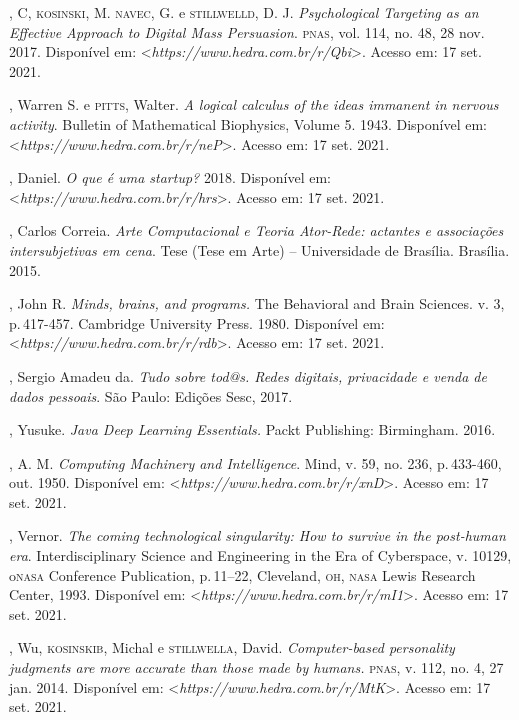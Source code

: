 \begin{bibliohedra}
, C, \textsc{kosinski}, M. \textsc{navec}, G. e \textsc{stillwelld}, D. J.
\emph{Psychological Targeting as an Effective Approach to Digital Mass
Persuasion}. \textsc{pnas}, vol. 114, no. 48, 28 nov. 2017. Disponível em:
\textless{}\emph{https://www.hedra.com.br/r/Qbi}\textgreater{}. Acesso em: 17 set. 2021.

, Warren S. e \textsc{pitts}, Walter. \emph{A logical calculus of the
ideas immanent in nervous activity}. Bulletin of Mathematical
Biophysics, Volume 5. 1943. Disponível em:
\textless{}\emph{https://www.hedra.com.br/r/neP}\textgreater{}. Acesso em: 17 set. 2021.

, Daniel. \emph{O que é uma startup?} 2018. Disponível em:
\textless{}\emph{https://www.hedra.com.br/r/hrs}\textgreater{}. Acesso em: 17 set. 2021.

, Carlos Correia. \emph{Arte Computacional e Teoria Ator-Rede:
actantes e associações intersubjetivas em cena}. Tese (Tese em Arte) --
Universidade de Brasília. Brasília. 2015.

, John R. \emph{Minds, brains, and programs.} The Behavioral and
Brain Sciences. v. 3, p.\,417-457. Cambridge University Press. 1980.
Disponível em: \textless{}\emph{https://www.hedra.com.br/r/rdb}\textgreater{}. Acesso em: 17 set. 2021.

, Sergio Amadeu da. \emph{Tudo sobre tod@s. Redes digitais,
privacidade e venda de dados pessoais}. São Paulo: Edições Sesc, 2017.

, Yusuke. \emph{Java Deep Learning Essentials.} Packt
Publishing: Birmingham. 2016.

, A. M. \emph{Computing Machinery and Intelligence}. Mind, v.
59, no. 236, p.\,433-460, out. 1950. Disponível em: \textless{}\emph{https://www.hedra.com.br/r/xnD}\textgreater{}. Acesso em: 17 set. 2021.

, Vernor. \emph{The coming technological singularity: How to
survive in the post-human era}. Interdisciplinary Science and
Engineering in the Era of Cyberspace, v. 10129, o\textsc{nasa} Conference
Publication, p.\,11--22, Cleveland, \textsc{oh}, \textsc{nasa} Lewis Research Center,
1993. Disponível em: \textless{}\emph{https://www.hedra.com.br/r/mI1}\textgreater{}. Acesso em: 17 set. 2021.

, Wu, \textsc{kosinskib}, Michal e \textsc{stillwella}, David.
\emph{Computer-based personality judgments are more accurate than
those made by humans.} \textsc{pnas}, v. 112, no. 4, 27 jan. 2014. Disponível em:
\textless{}\emph{https://www.hedra.com.br/r/MtK}\textgreater{}. Acesso em: 17 set. 2021.
\end{bibliohedra}


